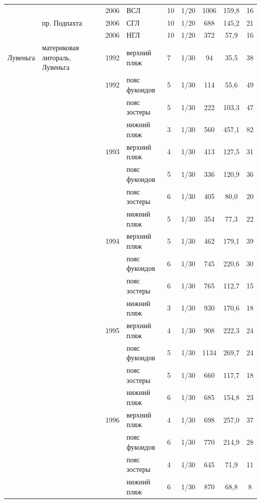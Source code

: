 \documentclass[12pt, a4paper]{disser}
\begin{document}
\begin{footnotesize}
\begin{longtable}{|p{2cm}|p{3cm}|p{1cm}|p{2cm}|p{1.5cm}|p{1cm}|*{3}{c|}}
		 &  & 2006 & ВСЛ & 10 & 1/20 & 1006 & 159,8 & 16
		\\ \cline{2-9}
		 & пр. Подпахта & 2006 & СГЛ & 10 & 1/20 & 688 & 145,2 & 21
		\\ \cline{3-9}
		 &  & 2006 & НГЛ & 10 & 1/20 & 372 & 57,9 & 16
		\\ \hline
	Лувеньга & материковая литораль, Лувеньга & 1992 & верхний пляж & 7 & 1/30 & 94 & 35,5 & 38
		\\ \cline{4-9}
		 &  & 1992 & пояс фукоидов & 5 & 1/30 & 114 & 55,6 & 49
		\\ \cline{4-9}
		 &  &  & пояс зостеры & 5 & 1/30 & 222 & 103,3 & 47
		\\ \cline{4-9}
		 &  &  & нижний пляж & 3 & 1/30 & 560 & 457,1 & 82
		\\ \cline{3-9}
		 &  & 1993 & верхний пляж & 4 & 1/30 & 413 & 127,5 & 31
		\\ \cline{4-9}
		 &  &  & пояс фукоидов & 5 & 1/30 & 336 & 120,9 & 36
		\\ \cline{4-9}
		 &  &  & пояс зостеры & 6 & 1/30 & 405 & 80,0 & 20
		\\ \cline{4-9}
		 &  & & нижний пляж & 5 & 1/30 & 354 & 77,3 & 22
		\\ \cline{3-9}
		 &  & 1994 & верхний пляж & 5 & 1/30 & 462 & 179,1 & 39
		\\ \cline{4-9}
		 &  &  & пояс фукоидов & 6 & 1/30 & 745 & 220,6 & 30
		\\ \cline{4-9}
		 &  &  & пояс зостеры & 6 & 1/30 & 765 & 112,7 & 15
		\\ \cline{4-9}
		 &  &  & нижний пляж & 3 & 1/30 & 930 & 170,6 & 18
		\\ \cline{3-9}
		 &  & 1995 & верхний пляж & 4 & 1/30 & 908 & 222,3 & 24
		\\ \cline{4-9}
		 &  &  & пояс фукоидов & 5 & 1/30 & 1134 & 269,7 & 24
		\\ \cline{4-9}
		 &  &  & пояс зостеры & 5 & 1/30 & 660 & 117,7 & 18
		\\ \cline{4-9}
		 &  &  & нижний пляж & 6 & 1/30 & 685 & 154,8 & 23
		\\ \cline{3-9}
		 &  & 1996 & верхний пляж & 4 & 1/30 & 698 & 257,0 & 37
		\\ \cline{4-9}
		 &  &  & пояс фукоидов & 6 & 1/30 & 770 & 214,9 & 28
		\\ \cline{4-9}
		 &  &  & пояс зостеры & 4 & 1/30 & 645 & 71,9 & 11
		\\ \cline{4-9}
		 &  &  & нижний пляж & 6 & 1/30 & 870 & 68,8 & 8
		\\ \cline{3-9}

\end{longtable}
\end{footnotesize}
\end{document}
